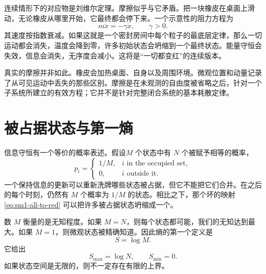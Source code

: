 连续情形下的对应物是刘维尔定理。摩擦似乎与它矛盾。把一块橡皮在桌面上滑动，无论橡皮从哪里开始，它最终都会停下来。一个示意性的阻力方程为
\begin{equation}
 m\ddot x=-\gamma\dot x,
 \qquad \gamma>0.
 \label{eq:sm1-drag}
\end{equation}
其速度按指数衰减。如果这就是一个密封房间中每个粒子的最底层定律，那么一切运动都会消失，温度会降到零，许多初始状态会坍缩到一个最终状态。能量守恒会失效，信息会消失，无序度会减小。这将是“一切都变红”的连续版本。

真实的摩擦并非如此。橡皮会加热桌面、自身以及周围环境。微观位置和动量记录了从可见运动中丢失的那些区别。摩擦是在未观测的自由度被省略之后，针对一个子系统所建立的有效方程；它并不是针对完整闭合系统的基本耗散定律。

\begin{classroomqa}
\end{classroomqa}

\section{被占据状态与第一熵}

信息守恒有一个等价的概率表述。假设\(M\) 个状态中有 \(N\) 个被赋予相等的概率，
\begin{equation}
 p_i=
 \begin{cases}
 1/M, & i\text{ in the occupied set},\\
 0, & i\text{ outside it}.
 \end{cases}
 \label{eq:sm1-uniform-occupied}
\end{equation}
一个保持信息的更新可以重新洗牌哪些状态被占据，但它不能把它们合并。在之后的每个时刻，仍然有 \(M\) 个概率为 \(1/M\) 的状态。相比之下，那个坏的映射 \eqref{eq:sm1-all-to-red} 可以把许多被占据状态坍缩成一个。

数 \(M\) 衡量的是无知程度。如果 \(M=N\)，则每个状态都可能，我们的无知达到最大。如果 \(M=1\)，则微观状态被精确知道。因此熵的第一个定义是
\begin{equation}
 S=\log M.
 \label{eq:sm1-entropy-logm}
\end{equation}
它给出
\begin{equation}
 S_{\max}=\log N,
 \qquad
 S_{\min}=0.
\end{equation}
如果状态空间是无限的，则不一定存在有限的上界。

